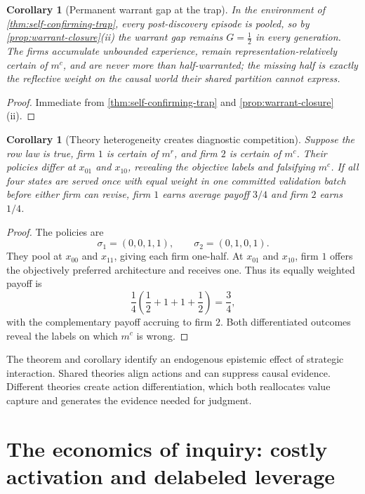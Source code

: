 \documentclass[11pt]{article}
\newtheorem{corollary}[assumption]{Corollary}
\begin{document}
\begin{corollary}[Permanent warrant gap at the trap]
\label{cor:permanent-gap}
In the environment of \cref{thm:self-confirming-trap}, every post-discovery
episode is pooled, so by \cref{prop:warrant-closure}(ii) the warrant gap
remains $G=\tfrac12$ in every generation.  The firms accumulate unbounded
experience, remain representation-relatively certain of $m^c$, and are never
more than half-warranted; the missing half is exactly the reflective weight on
the causal world their shared partition cannot express.
\end{corollary}

\begin{proof}
Immediate from \cref{thm:self-confirming-trap} and
\cref{prop:warrant-closure}(ii).
\end{proof}

\begin{corollary}[Theory heterogeneity creates diagnostic competition]
\label{cor:heterogeneous-theories}
Suppose the row law is true, firm $1$ is certain of $m^r$, and firm $2$ is
certain of $m^c$.  Their policies differ at $x_{01}$ and $x_{10}$, revealing
the objective labels and falsifying $m^c$.  If all four states are served once
with equal weight in one committed validation batch before either firm can
revise, firm $1$ earns average payoff $3/4$ and firm $2$ earns $1/4$.
\end{corollary}

\begin{proof}
The policies are
\[
\sigma_1=(0,0,1,1),
\qquad
\sigma_2=(0,1,0,1).
\]
They pool at $x_{00}$ and $x_{11}$, giving each firm one-half.  At $x_{01}$ and
$x_{10}$, firm $1$ offers the objectively preferred architecture and receives
one.  Thus its equally weighted payoff is
\[
\frac14\left(\frac12+1+1+\frac12\right)=\frac34,
\]
with the complementary payoff accruing to firm $2$.  Both differentiated
outcomes reveal the labels on which $m^c$ is wrong.
\end{proof}

The theorem and corollary identify an endogenous epistemic effect of strategic
interaction.  Shared theories align actions and can suppress causal evidence.
Different theories create action differentiation, which both reallocates value
capture and generates the evidence needed for judgment.

\section{The economics of inquiry: costly activation and delabeled leverage}
\label{sec:inquiry-economics}
\end{document}
